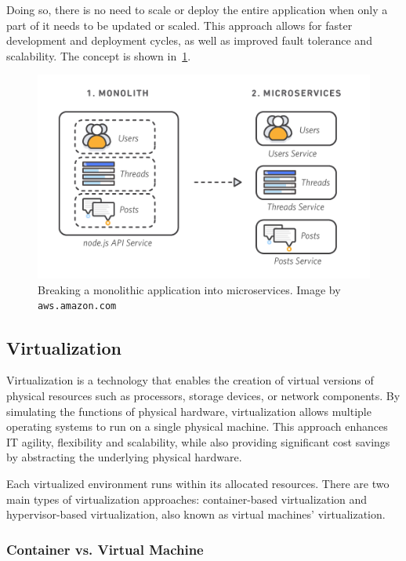 Doing so, there is no need to scale or deploy the entire application when only a part of it needs to be updated or scaled. This approach allows for faster development and deployment cycles, as well as improved fault tolerance and scalability. The concept is shown in~\cref{fig:monolith-microservices}.

\begin{figure}[ht]
  \centering
  \includegraphics[scale=0.6]{chapters/02/assets/monolith-microservices.png}
  \caption[Breaking a monolithic application into microservices]{Breaking a monolithic application into microservices. Image by \texttt{aws.amazon.com}}
  \label{fig:monolith-microservices}
\end{figure}

\subsection{Virtualization}

Virtualization is a technology that enables the creation of virtual versions of physical resources such as processors, storage devices, or network components. By simulating the functions of physical hardware, virtualization allows multiple operating systems to run on a single physical machine. This approach enhances IT agility, flexibility and scalability, while also providing significant cost savings by abstracting the underlying physical hardware.~\cite{virtualization-aws}

Each virtualized environment runs within its allocated resources. There are two main types of virtualization approaches: container-based virtualization and hypervisor-based virtualization, also known as virtual machines' virtualization.

\subsubsection{Container vs. Virtual Machine}

